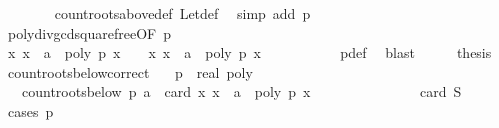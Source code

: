 \begin{isabellebody}
\ \ \ \ \ \ \isamarkupfalse%
\ count{\isacharunderscore}roots{\isacharunderscore}above{\isacharunderscore}def\ Let{\isacharunderscore}def\ \isamarkupfalse%
\ {\isacharparenleft}simp\ add{\isacharcolon}\ {\isacharbackquoteopen}p\ {\isasymnoteq}\ {}{\isacharbackquoteclose}{\isacharparenright}\isanewline
\ \ \isamarkupfalse%
\ \isamarkupfalse%
\ poly{\isacharunderscore}div{\isacharunderscore}gcd{\isacharunderscore}squarefree{\isacharparenleft}{}{\isacharparenright}{\isacharbrackleft}OF\ {\isacharbackquoteopen}p\ {\isasymnoteq}\ {}{\isacharbackquoteclose}{\isacharbrackright}\isanewline
\ \ \ \ \ \ \isamarkupfalse%
\ {\isachardoublequoteopen}{\isacharbraceleft}x{\isachardot}\ x\ {\isachargreater}\ a\ {\isasymand}\ poly\ p{\isacharprime}\ x\ {\isacharequal}\ {}{\isacharbraceright}\ {\isacharequal}\ {\isacharbraceleft}x{\isachardot}\ x\ {\isachargreater}\ a\ {\isasymand}\ poly\ p\ x\ {\isacharequal}\ {}{\isacharbraceright}{\isachardoublequoteclose}\ \isanewline
\ \ \ \ \ \ \isamarkupfalse%
\ p{\isacharprime}{\isacharunderscore}def\ \isamarkupfalse%
\ blast\isanewline
\ \ \isamarkupfalse%
\ \isamarkupfalse%
\ {\isacharquery}thesis\ \isacommand{{\isachardot}}\isamarkupfalse%
\isanewline
{}\isamarkupfalse%
%
\endisatagproof
{\isafoldproof}%
%
\isadelimproof
\isanewline
%
\endisadelimproof
\isanewline
{}\isamarkupfalse%
\ count{\isacharunderscore}roots{\isacharunderscore}below{\isacharunderscore}correct{\isacharcolon}\isanewline
\ \ \ p\ {\isacharcolon}{\isacharcolon}\ {\isachardoublequoteopen}real\ poly{\isachardoublequoteclose}\isanewline
\ \ \ {\isachardoublequoteopen}count{\isacharunderscore}roots{\isacharunderscore}below\ p\ a\ {\isacharequal}\ card\ {\isacharbraceleft}x{\isachardot}\ x\ {\isasymle}\ a\ {\isasymand}\ poly\ p\ x\ {\isacharequal}\ {}{\isacharbraceright}{\isachardoublequoteclose}\ \isanewline
\ \ \ \ \ \ \ \ \ {\isacharparenleft}\ {\isachardoublequoteopen}{\isacharunderscore}\ {\isacharequal}\ card\ {\isacharquery}S{\isachardoublequoteclose}{\isacharparenright}\isanewline
%
\isadelimproof
%
\endisadelimproof
%
\isatagproof
{}\isamarkupfalse%
\ {\isacharparenleft}cases\ {\isachardoublequoteopen}p\ {\isacharequal}\ {}{\isachardoublequoteclose}{\isacharparenright}\isanewline
\ \ \isamarkupfalse%

\end{isabellebody}
